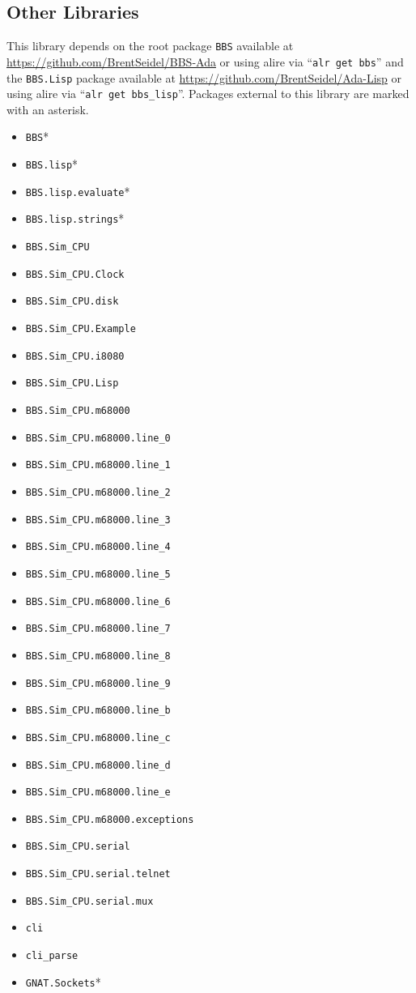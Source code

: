 \documentclass[10pt, openany]{book}
\newcommand{\package}[1]{\texttt{#1}}
\newcommand{\keyword}[1]{\texttt{#1}}
\begin{document}
\subsection{Other Libraries}
This library depends on the root package \package{BBS} available at \url{https://github.com/BrentSeidel/BBS-Ada} or using alire via ``\keyword{alr get bbs}'' and the \package{BBS.Lisp} package available at \url{https://github.com/BrentSeidel/Ada-Lisp} or using alire via ``\keyword{alr get bbs\_lisp}''.  Packages external to this library are marked with an asterisk.
\begin{itemize}
  \item \package{BBS}*
  \item \package{BBS.lisp}*
  \item \package{BBS.lisp.evaluate}*
  \item \package{BBS.lisp.strings}*
  \item \package{BBS.Sim\_CPU}
  \item \package{BBS.Sim\_CPU.Clock}
  \item \package{BBS.Sim\_CPU.disk}
  \item \package{BBS.Sim\_CPU.Example}
  \item \package{BBS.Sim\_CPU.i8080}
  \item \package{BBS.Sim\_CPU.Lisp}
  \item \package{BBS.Sim\_CPU.m68000}
  \item \package{BBS.Sim\_CPU.m68000.line\_0}
  \item \package{BBS.Sim\_CPU.m68000.line\_1}
  \item \package{BBS.Sim\_CPU.m68000.line\_2}
  \item \package{BBS.Sim\_CPU.m68000.line\_3}
  \item \package{BBS.Sim\_CPU.m68000.line\_4}
  \item \package{BBS.Sim\_CPU.m68000.line\_5}
  \item \package{BBS.Sim\_CPU.m68000.line\_6}
  \item \package{BBS.Sim\_CPU.m68000.line\_7}
  \item \package{BBS.Sim\_CPU.m68000.line\_8}
  \item \package{BBS.Sim\_CPU.m68000.line\_9}
  \item \package{BBS.Sim\_CPU.m68000.line\_b}
  \item \package{BBS.Sim\_CPU.m68000.line\_c}
  \item \package{BBS.Sim\_CPU.m68000.line\_d}
  \item \package{BBS.Sim\_CPU.m68000.line\_e}
  \item \package{BBS.Sim\_CPU.m68000.exceptions}
  \item \package{BBS.Sim\_CPU.serial}
  \item \package{BBS.Sim\_CPU.serial.telnet}
  \item \package{BBS.Sim\_CPU.serial.mux}
  \item \package{cli}
  \item \package{cli\_parse}
  \item \package{GNAT.Sockets}*
\end{itemize}
\end{document}
